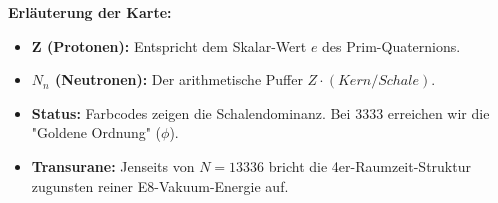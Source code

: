 \documentclass[landscape,10pt]{article}
\begin{document}
	
	\vspace{1cm}
	
	\textbf{Erläuterung der Karte:}
	\begin{itemize}
		\item \textbf{Z (Protonen):} Entspricht dem Skalar-Wert $e$ des Prim-Quaternions.
		\item \textbf{$N_n$ (Neutronen):} Der arithmetische Puffer $Z \cdot (Kern/Schale)$.
		\item \textbf{Status:} Farbcodes zeigen die Schalendominanz. Bei 3333 erreichen wir die "Goldene Ordnung" ($\phi$).
		\item \textbf{Transurane:} Jenseits von $N=13336$ bricht die 4er-Raumzeit-Struktur zugunsten reiner E8-Vakuum-Energie auf.
	\end{itemize}
	
\end{document}
